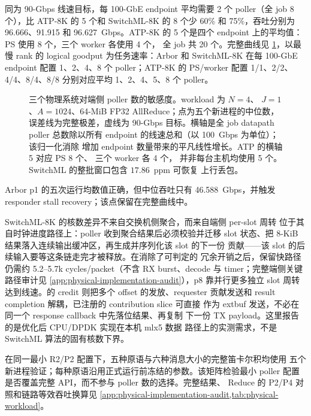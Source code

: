 同为 90-Gbps 线速目标，\sysname 每 100-GbE endpoint 平均需要 2 个
poller（全 job 8 个），比 ATP-8K 的 5 个和 SwitchML-8K 的 8 个少
60\% 和 75\%，吞吐分别为 96.666、91.915 和 96.627~Gbps。ATP-8K 的
5 个是四个 endpoint 上的平均值：PS 使用 8 个，三个 worker 各使用 4 个，
全 job 共 20 个。完整曲线见 \cref{fig:physical-endpoint-pollers}，以最慢
rank 的 logical goodput 为任务速率：Arbor 和 SwitchML-8K 在每 100-GbE
endpoint 配置 1、2、4、8 个 poller；ATP-8K 的 PS/worker 配置
1/1、2/2、4/4、8/4、8/8 分别对应平均 1、2、4、5、8 个 poller。

\begin{figure}[t]
\centering

\caption{三个物理系统对端侧 poller 数的敏感度。workload 为 $N=4$、
$J=1$、$A=1024$、64-MiB FP32 AllReduce；点为五个新进程的中位数，
误差线为完整极差，虚线为 90-Gbps 目标。横轴是全 job datapath poller
总数除以所有 endpoint 的线速总和（以 100~Gbps 为单位）；该归一化消除
增加 endpoint 数量带来的平凡线性增长。ATP 的横轴 5 对应 PS 8 个、
三个 worker 各 4 个，
并非每台主机均使用 5 个。SwitchML 的整批窗口包含 $17.86$~ppm 可恢复
上行丢包。}
\label{fig:physical-endpoint-pollers}
\end{figure}

Arbor p1 的五次运行均数值正确，但中位吞吐只有 46.588~Gbps，并触发
responder stall recovery；该点保留在完整曲线中。

SwitchML-8K 的核数差异不来自交换机侧聚合，而来自端侧 per-slot 周转
位于其自时钟进度路径上：poller 收到聚合结果后必须校验并迁移 slot
状态、把 8-KiB 结果落入连续输出缓冲区，再生成并序列化该 slot 的下一份
贡献——该 slot 的后续输入要等这条链走完才被释放。在消除了可判定的
冗余开销之后，保留快路径仍需约 5.2--5.7k cycles/packet（不含 RX
burst、decode 与 timer；完整端侧关键路径审计见
\cref{app:physical-implementation-audit}），p8 靠并行更多独立 slot
周转达到线速。\sysname 的 credit 则把多个 offset 的发放、requester
贡献发送和 result completion 解耦，已注册的 contribution slice 可直接
作为 extbuf 发送，不必在同一个 response callback 中先落位结果、再复制
下一份 TX payload。这里报告的是优化后 CPU/DPDK 实现在本机 mlx5 数据
路径上的实测需求，不是 SwitchML 算法的固有核数下界。

在同一最小 R2/P2 配置下，五种原语与六种消息大小的完整笛卡尔积均使用
五个新进程验证；每种原语沿用正式运行前冻结的参数。该矩阵检验最小
poller 配置是否覆盖完整 API，而不参与 poller 数的选择。完整结果、
Reduce 的 P2/P4 对照和链路等效吞吐换算见
\cref{app:physical-implementation-audit,tab:physical-workload}。


